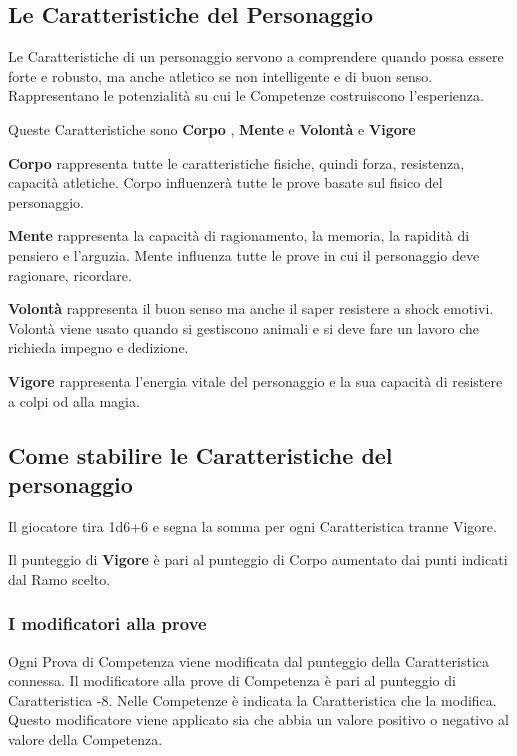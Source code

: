 \documentclass[12pt,a4paper,twoside,openany]{book}
\begin{document}
\begin{multicols}{2}

\subsection{Le Caratteristiche del Personaggio}

Le Caratteristiche di un personaggio servono a comprendere quando possa essere forte e robusto, ma anche atletico se non intelligente e di buon senso. Rappresentano le potenzialità su cui le Competenze costruiscono l'esperienza.

Queste Caratteristiche sono \textbf{Corpo} , \textbf{Mente}  e \textbf{Volontà}  e \textbf{Vigore}

\textbf{Corpo} rappresenta tutte le caratteristiche fisiche, quindi forza, resistenza, capacità atletiche. Corpo influenzerà tutte le prove basate sul fisico del personaggio.

\textbf{Mente} rappresenta la capacità di ragionamento, la memoria, la rapidità di pensiero e l'arguzia. Mente influenza tutte le prove in cui il personaggio deve ragionare, ricordare.

\textbf{Volontà} rappresenta il buon senso ma anche il saper resistere a shock emotivi. Volontà viene usato quando si gestiscono animali e si deve fare un lavoro che richieda impegno e dedizione.

\textbf{Vigore} rappresenta l'energia vitale del personaggio e la sua capacità di resistere a colpi od alla magia.

\subsection{Come stabilire le Caratteristiche del personaggio}

Il giocatore tira 1d6+6 e segna la somma per ogni Caratteristica tranne Vigore.

Il punteggio di \textbf{Vigore} è pari al punteggio di Corpo aumentato dai punti indicati dal Ramo scelto.

\subsubsection{I modificatori alla prove}

Ogni Prova di Competenza viene modificata dal punteggio della Caratteristica connessa. 
Il modificatore alla prove di Competenza è pari al punteggio di Caratteristica -8. Nelle Competenze è indicata la Caratteristica che la modifica. Questo modificatore viene applicato sia che abbia un valore positivo o negativo al valore della Competenza.

\end{multicols}
\end{document}
